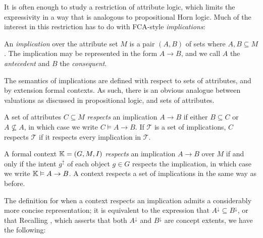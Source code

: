 It is often enough to study a restriction of attribute logic, which limits the
expressivity in a way that is analogous to propositional Horn logic. Much of the
interest in this restriction has to do with FCA-style \textit{implications}:

\begin{definition}
	\label{definition:implication}

	An \emph{implication} over the attribute set $M$ is a pair $(A,B)$ of sets where
	$A,B \subseteq M$. The implication may be represented in the form
	$A \rightarrow B$, and we call $A$ the \emph{antecedent} and $B$ the \emph{consequent}.
\end{definition}

The semantics of implications are defined with respect to sets of attributes,
and by extension formal contexts. As such, there is an obvious analogue between
valuations as discussed in propositional logic, and sets of attributes.

\begin{definition}
	\label{definition:implication-respect}

	A set of attributes $C \subseteq M$ \emph{respects} an implication $A\rightarrow
		B$ if either $B \subseteq C$ or $A \not \subseteq A$, in which case we write
	$C \vDash A \rightarrow B$. If $\mathcal{T}$ is a set of implications, $C$
	respects $\mathcal{T}$ if it respects every implication in $\mathcal{T}$.
\end{definition}

\begin{definition}
	\label{definition:implication-respect-context}

	A formal context $\mathbb{K} = (G,M,\mathrel{I})$ \emph{respects} an implication $A \rightarrow
		B$ over $M$ if and only if the intent $g^{\uparrow}$ of each object $g \in G$ respects
	the implication, in which case we write $\mathbb{K} \vDash A \rightarrow B$. A context
	respects a set of implications in the same way as before.
\end{definition}

The definition for when a context respects an implication admits a considerably more
concise representation; it is equivalent to the expression that
$A^{\downarrow}\subseteq B^{\downarrow}$, or that 
Recalling , which asserts that both $A
		^{\downarrow}$ and $B^{\downarrow}$ are concept extents, we have the following:

